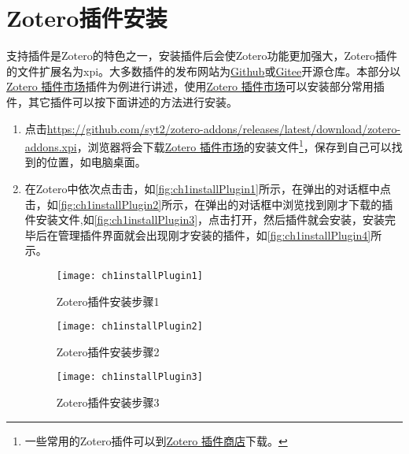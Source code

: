 \documentclass[theorem=false,mathfont=none,openany,sub3section]{easybook}
\begin{document}
\section{Zotero插件安装}\label{sec:installPlug}
支持插件是Zotero的特色之一，安装插件后会使Zotero功能更加强大，Zotero插件的文件扩展名为xpi。大多数插件的发布网站为\href{https://github.com/}{Github}或\href{https://gitee.com/}{Gitee}开源仓库。本部分以\href{https://github.com/syt2/zotero-addons}{Zotero 插件市场}插件为例进行讲述，使用\href{https://github.com/syt2/zotero-addons}{Zotero 插件市场}可以安装部分常用插件，其它插件可以按下面讲述的方法进行安装。
\begin{enumerate}
	\item 点击\href{https://github.com/syt2/zotero-addons/releases/latest/download/zotero-addons.xpi}{https://github.com/syt2/zotero-addons/releases/latest/download/zotero-addons.xpi}，浏览器将会下载\href{https://github.com/syt2/zotero-addons}{Zotero 插件市场}的安装文件\footnote{一些常用的Zotero插件可以到\href{https://zotero-chinese.com/plugins/}{Zotero 插件商店}下载。}，保存到自己可以找到的位置，如电脑桌面。
	\item 在Zotero中依次点击击，如\autoref{fig:ch1installPlugin1}所示，在弹出的对话框中点击，如\autoref{fig:ch1installPlugin2}所示，在弹出的对话框中浏览找到刚才下载的插件安装文件,如\autoref{fig:ch1installPlugin3}，点击打开，然后插件就会安装，安装完毕后在管理插件界面就会出现刚才安装的插件，如\autoref{fig:ch1installPlugin4}所示。
	
	\begin{figure}[htbp]
		\centering
		\begin{minipage}[t]{\dimexpr0.5\textwidth-4em}
			\centering
			\texttt{[image: ch1installPlugin1]}
			\caption{Zotero插件安装步骤1}
			\label{fig:ch1installPlugin1}
			\end{minipage}
			\hspace{1.5cm}
			\begin{minipage}[t]{\dimexpr0.5\textwidth-4em}
			\centering
			\texttt{[image: ch1installPlugin2]}
			\caption{Zotero插件安装步骤2}
			\label{fig:ch1installPlugin2}
			\end{minipage}
	\end{figure}
	
	\begin{figure}[htbp]
		\centering
		\texttt{[image: ch1installPlugin3]}
		\caption{Zotero插件安装步骤3}
		\label{fig:ch1installPlugin3}
	\end{figure}
	

\end{enumerate}
\end{document}
